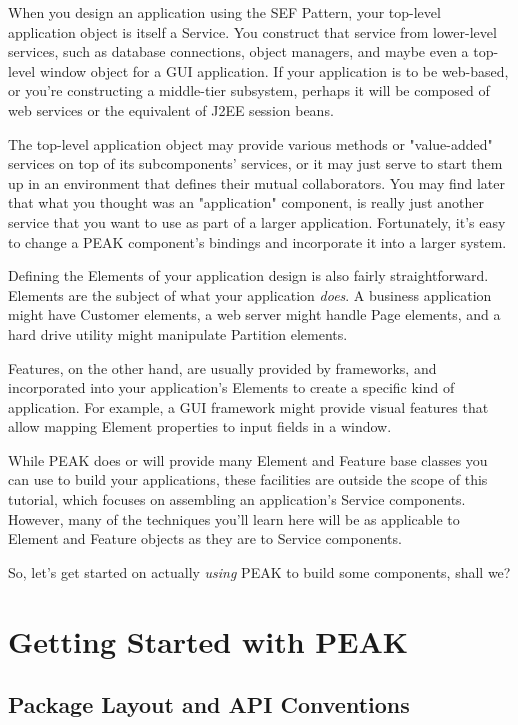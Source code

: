 When you design an application using the SEF Pattern, your top-level 
application object is itself a Service.  You construct that service from
lower-level services, such as database connections, object managers,
and maybe even a top-level window object for a GUI application.  If your
application is to be web-based, or you're constructing a middle-tier
subsystem, perhaps it will be composed of web services or the equivalent
of J2EE session beans.

The top-level application object may provide various methods or "value-added"
services on top of its subcomponents' services, or it may just serve to start
them up in an environment that defines their mutual collaborators.  You may
find later that what you thought was an "application" component, is really 
just another service that you want to use as part of a larger application.
Fortunately, it's easy to change a PEAK component's bindings and
incorporate it into a larger system.

Defining the Elements of your application design is also fairly
straightforward.  Elements are the subject of what your application
\emph{does}.  A business application might have Customer elements, a web
server might handle Page elements, and a hard drive utility might manipulate
Partition elements.

Features, on the other hand, are usually provided by frameworks, and
incorporated into your application's Elements to create a specific kind of
application.  For example, a GUI framework might provide visual features that
allow mapping Element properties to input fields in a window.

While PEAK does or will provide many Element and Feature base classes you can
use to build your applications, these facilities are outside the scope of
this tutorial, which focuses on assembling an application's Service
components.  However, many of the techniques you'll learn here will be as
applicable to Element and Feature objects as they are to Service components.

So, let's get started on actually \emph{using} PEAK to build some
components, shall we?






\section{Getting Started with PEAK}

\subsection{Package Layout and API Conventions}

